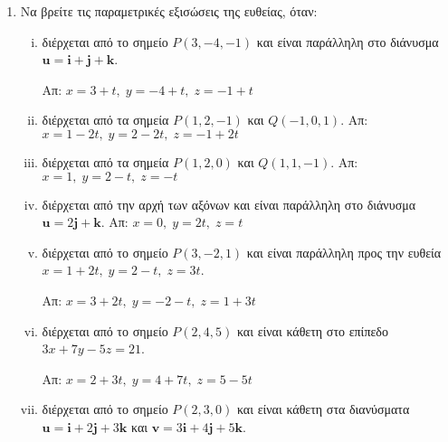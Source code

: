 




\geometry{left=15.63mm,right=15.63mm,top=28.25mm,bottom=34.25mm,
footskip=24.16mm,headsep=24.16mm}

\pagestyle{askhseis}
\everymath{\displaystyle}



\begin{center}
\minibox{\large\bfseries \textcolor{Col1}{Ασκήσεις στις ευθείες και τα επίπεδα}}
\end{center}

\vspace{\baselineskip}

\begin{enumerate}
  \item Να βρείτε τις παραμετρικές εξισώσεις της ευθείας, όταν:
    \begin{enumerate}[i)]
      \item διέρχεται από το σημείο $ P(3,-4,-1) $ και είναι παράλληλη στο διάνυσμα 
        $ \mathbf{u} = \mathbf{i}+ \mathbf{j}+ \mathbf{k} $. 

        \hfill Απ: $ x=3+t, \; y=-4+t, \; z=-1+t $

      \item διέρχεται από τα σημεία $ P(1,2,-1) $ και $ Q(-1,0,1) $.
        \hfill Απ: $ x=1-2t, \; y=2-2t, \; z=-1+2t $ 

      \item διέρχεται από τα σημεία $ P(1,2,0) $ και $ Q(1,1,-1) $.
        \hfill Απ: $ x=1, \; y=2-t, \; z=-t $ 

      \item διέρχεται από την αρχή των αξόνων και είναι παράλληλη στο διάνυσμα 
        $ \mathbf{u} = 2 \mathbf{j}+ \mathbf{k} $.
        \hfill Απ: $ x=0, \; y=2t, \; z=t $ 

      \item διέρχεται από το σημείο $ P(3,-2,1) $ και είναι παράλληλη προς την ευθεία 
        $ x=1+2t, \; y=2-t, \; z=3t $.

        \hfill Απ: $ x=3+2t, \; y=-2-t, \; z=1+3t $ 

      \item διέρχεται από το σημείο $ P(2,4,5) $ και είναι κάθετη στο επίπεδο 
        $ 3x+7y-5z=21 $.

        \hfill Απ: $ x=2+3t, \; y=4+7t, \; z=5-5t $ 

      \item διέρχεται από το σημείο $ P(2,3,0) $ και είναι κάθετη στα διανύσματα 
        $ \mathbf{u} = \mathbf{i}+2 \mathbf{j}+3 \mathbf{k} $ και $ \mathbf{v} = 3
        \mathbf{i}+ 4 \mathbf{j}+5 \mathbf{k} $.


\end{enumerate}
\end{enumerate}
